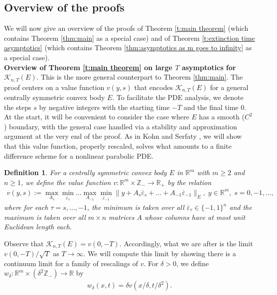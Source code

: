\documentclass[reqno]{amsart}
\newtheorem{defn}[theorem]{Definition}
\numberwithin{equation}{section}
\newcommand{\R}{\mathbb R}
\begin{document}
\subsection{Overview of the proofs} We will now give an overview of the proofs of Theorem \ref{t:main theorem} (which contains Theorem \ref{thm:main} as a special case) and of Theorem \ref{t:extinction time asymptotics} (which contains Theorem \ref{thm:asymptotics as m goes to infinity} as a special case). \\

\noindent \textbf{Overview of Theorem \ref{t:main theorem} on large $T$ asymptotics for $\mathcal{K}_{n,T}(E)$}. This is the more general counterpart to Theorem \ref{thm:main}. The proof centers on a value function $v(y,s)$ that encodes  $\mathcal{K}_{n,T}(E)$ for a general centrally symmetric convex body $E$. To facilitate the PDE analysis, we denote the steps $s$ by negative integers with the starting time $-T$ and the final time $0$. At the start, it will be convenient to consider the case where $E$ has a smooth ($C^2$) boundary, with the general case handled via a stability and approximation argument at the very end of the proof. As in Kohn and Serfaty \cite{KohnSerfaty2006}, we will show that this value function, properly rescaled, solves what amounts to a finite difference scheme for a nonlinear parabolic PDE. 
\begin{defn} \label{def:v}
For a centrally symmetric convex body $E$ in $\R^m$ with $m \geq 2$ and $n \geq 1$,  we define the value function $v:\mathbb{R}^m\times \mathbb{Z}_- \to \R_+$ by the relation
\begin{align*}
  v(y,s) := \max_{A_s}\min_{\overline \varepsilon_s}\ldots\max_{A_{-1}}\min_{\overline \varepsilon_{-1}}\|y+A_s\overline\varepsilon_s+\ldots+A_{-1}\overline\varepsilon_{-1}\|_E,\;  y\in \mathbb{R}^m,\;s=0,-1,\ldots,
\end{align*}
where for each $\tau=s,\ldots,-1$, the minimum is taken over all $\overline \varepsilon_\tau \in \{-1,1\}^n$ and the maximum is taken over all $m\times n$ matrices $A$ whose columns  have at most unit Euclidean length each. 
\end{defn}
Observe that  $\mathcal{K}_{n,T}(E) = v(0,-T)$. Accordingly, what we are after is the limit $v(0,-T)/\sqrt{T}$ as $T\to \infty$. We will compute this limit by showing there is a continuum limit for a family of rescalings of $v$. For $\delta>0$, we define $w_\delta:\mathbb{R}^m\times (\delta^2\mathbb{Z}_-)\to\mathbb{R}$ by 
\begin{align*}
w_\delta(x,t) = \delta v(x/\delta,t/\delta^2).
\end{align*}
\end{document}
